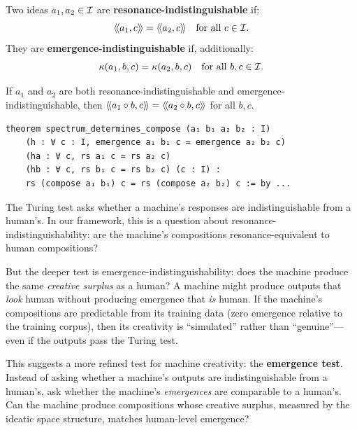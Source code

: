 \begin{definition}
\label{def:resonance-indist}
Two ideas $a_1, a_2 \in \mathcal{I}$ are \textbf{resonance-indistinguishable} if:
\[
  \langle\!\langle a_1, c \rangle\!\rangle = \langle\!\langle a_2, c \rangle\!\rangle \quad \text{for all } c \in \mathcal{I}.
\]
They are \textbf{emergence-indistinguishable} if, additionally:
\[
  \kappa(a_1, b, c) = \kappa(a_2, b, c) \quad \text{for all } b, c \in \mathcal{I}.
\]
\end{definition}

\begin{theorem}
\label{thm:indistinguishable}
If $a_1$ and $a_2$ are both resonance-indistinguishable and
emergence-indistinguishable, then $\langle\!\langle a_1 \circ b, c \rangle\!\rangle = \langle\!\langle a_2 \circ b, c \rangle\!\rangle$
for all $b, c$.
\end{theorem}

\begin{lstlisting}[caption={Spectrum determines composition (IDT\_v3\_Emergence.lean)}]
theorem spectrum_determines_compose (a₁ b₁ a₂ b₂ : I)
    (h : ∀ c : I, emergence a₁ b₁ c = emergence a₂ b₂ c)
    (ha : ∀ c, rs a₁ c = rs a₂ c)
    (hb : ∀ c, rs b₁ c = rs b₂ c) (c : I) :
    rs (compose a₁ b₁) c = rs (compose a₂ b₂) c := by ...
\end{lstlisting}

\begin{interpretation}
The Turing test asks whether a machine's responses are indistinguishable from a
human's. In our framework, this is a question about resonance-indistinguishability:
are the machine's compositions resonance-equivalent to human compositions?

But the deeper test is emergence-indistinguishability: does the machine produce
the same \emph{creative surplus} as a human? A machine might produce outputs
that \emph{look} human without producing emergence that \emph{is} human. If the
machine's compositions are predictable from its training data (zero emergence
relative to the training corpus), then its creativity is ``simulated'' rather
than ``genuine''---even if the outputs pass the Turing test.

This suggests a more refined test for machine creativity: the \textbf{emergence
test}. Instead of asking whether a machine's outputs are indistinguishable from
a human's, ask whether the machine's \emph{emergences} are comparable to a
human's. Can the machine produce compositions whose creative surplus, measured
by the ideatic space structure, matches human-level emergence?
\end{interpretation}


